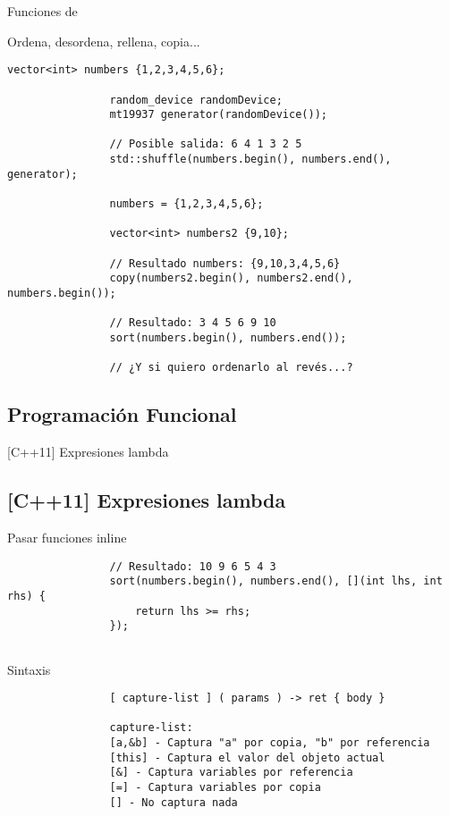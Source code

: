 \documentclass{beamer}
\newcommand{\normalSizeItem}[1] {
  \normalsize{\item #1}
}
\newcommand{\newFrameWithoutIndex}[1]{
	\begin{frame}
		#1
		\thispagestyle{empty}
	\end{frame}
}
\newcommand{\newSectionWithoutIndex}[1]{
	\newFrameWithoutIndex{\section{#1}}
}
\begin{document}
		\begin{frame}[fragile]{Funciones de }	
			\begin{itemize}
			
				\normalSizeItem { Ordena, desordena, rellena, copia... }
				\begin{lstlisting}[basicstyle={\tiny\ttfamily}]
				vector<int> numbers {1,2,3,4,5,6};
	
				random_device randomDevice;
				mt19937 generator(randomDevice());
				
				// Posible salida: 6 4 1 3 2 5 
				std::shuffle(numbers.begin(), numbers.end(), generator);
				
				numbers = {1,2,3,4,5,6};
				
				vector<int> numbers2 {9,10};
				
				// Resultado numbers: {9,10,3,4,5,6}
				copy(numbers2.begin(), numbers2.end(), numbers.begin());
				
				// Resultado: 3 4 5 6 9 10
				sort(numbers.begin(), numbers.end());
				
				// ¿Y si quiero ordenarlo al revés...?
				\end{lstlisting}				
			\end{itemize}
		\end{frame}
		
	\newSectionWithoutIndex{Programación Funcional}	
	
		\begin{frame}[fragile]{[C++11] Expresiones lambda \lambda}	
			\subsection{[C++11] Expresiones lambda \lambda}		
			\begin{itemize}
			
				\normalSizeItem { Pasar funciones inline }
				\begin{lstlisting}
				// Resultado: 10 9 6 5 4 3 
				sort(numbers.begin(), numbers.end(), [](int lhs, int rhs) { 
					return lhs >= rhs; 
				});
				
				\end{lstlisting}	
				
				\normalSizeItem { Sintaxis }
				\begin{lstlisting}
				[ capture-list ] ( params ) -> ret { body }
				
				capture-list:
				[a,&b] - Captura "a" por copia, "b" por referencia
				[this] - Captura el valor del objeto actual
				[&] - Captura variables por referencia
				[=] - Captura variables por copia
				[] - No captura nada
				\end{lstlisting}	
							
			\end{itemize}
		\end{frame}
		
\end{document}
